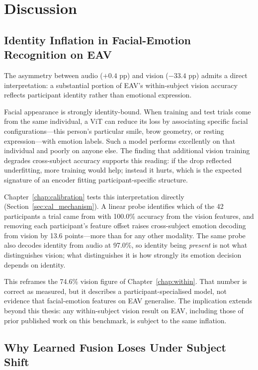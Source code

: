 \section{Discussion}
\label{sec:cs_discussion}

\subsection{Identity Inflation in Facial-Emotion Recognition on EAV}

The asymmetry between audio ($+0.4$ pp) and vision ($-33.4$ pp) admits a direct
interpretation: a substantial portion of EAV's within-subject vision accuracy
reflects participant identity rather than emotional expression.

Facial appearance is strongly identity-bound. When training and test trials come from
the same individual, a ViT can reduce its loss by associating specific facial
configurations---this person's particular smile, brow geometry, or resting
expression---with emotion labels. Such a model performs excellently on that individual
and poorly on anyone else. The finding that additional vision training degrades
cross-subject accuracy supports this reading: if the drop reflected underfitting, more
training would help; instead it hurts, which is the expected signature of an encoder
fitting participant-specific structure.

Chapter~\ref{chap:calibration} tests this interpretation directly
(Section~\ref{sec:cal_mechanism}). A linear probe identifies which of the 42
participants a trial came from with 100.0\% accuracy from the vision features, and
removing each participant's feature offset raises cross-subject emotion decoding from
vision by 13.6 points---more than for any other modality. The same probe also
decodes identity from audio at 97.0\%, so identity being \emph{present} is not what
distinguishes vision; what distinguishes it is how strongly its emotion decision
depends on identity.

This reframes the 74.6\% vision figure of Chapter~\ref{chap:within}. That number is
correct as measured, but it describes a participant-specialised model, not evidence
that facial-emotion features on EAV generalise. The implication extends beyond this
thesis: any within-subject vision result on EAV, including those of prior published
work on this benchmark, is subject to the same inflation.

\subsection{Why Learned Fusion Loses Under Subject Shift}

